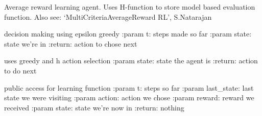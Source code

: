 \documentclass[letterpaper,10pt,english]{sphinxmanual}
\begin{document}
\begin{fulllineitems}
\label{Agents:morl_agents.MORLHLearningAgent}
Average reward learning agent. Uses H-function to store model based evaluation function.
Also see: `MultiCriteriaAverageReward RL', S.Natarajan

\begin{fulllineitems}
\label{Agents:morl_agents.MORLHLearningAgent.decide}
decision making using epsilon greedy
:param t: steps made so far
:param state: state we're in
:return: action to chose next

\end{fulllineitems}


\begin{fulllineitems}
\label{Agents:morl_agents.MORLHLearningAgent.get_learned_action}
uses greedy and h action selection
:param state: state the agent is
:return: action to do next

\end{fulllineitems}


\begin{fulllineitems}
\label{Agents:morl_agents.MORLHLearningAgent.learn}
public access for learning function
:param t: steps so far
:param last\_state: last state we were visiting
:param action: action we chose
:param reward: reward we received
:param state: state we're now in
:return: nothing

\end{fulllineitems}


\end{fulllineitems}

\end{document}
